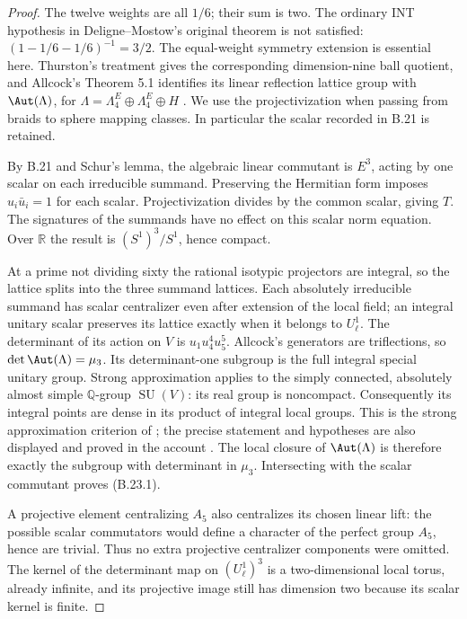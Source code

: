 \begin{proof}
The twelve weights are all \(1/6\); their sum is two.
The ordinary INT hypothesis in Deligne--Mostow's original
theorem is not satisfied: \((1-1/6-1/6)^{-1}=3/2\).
The equal-weight symmetry extension is essential here.
Thurston's treatment gives the corresponding dimension-nine
ball quotient, and Allcock's Theorem 5.1 identifies its linear
reflection lattice group with
\(\Aut(\Lambda)\), for
\(\Lambda=\Lambda_4^E\oplus\Lambda_4^E\oplus H\)
\citep{Thurston1998,Allcock2000}. We use the projectivization
when passing from braids to sphere mapping classes. In
particular the scalar recorded in B.21 is retained.

By B.21 and Schur's lemma, the algebraic linear commutant is
\(E^3\), acting by one scalar on each irreducible summand.
Preserving the Hermitian form imposes \(u_i\bar u_i=1\)
for each scalar. Projectivization divides by the common
scalar, giving \(T\). The signatures of the summands have
no effect on this scalar norm equation. Over \(\mathbb R\)
the result is \((S^1)^3/S^1\), hence compact.

At a prime not dividing sixty the rational isotypic
projectors are integral, so the lattice splits into the
three summand lattices. Each absolutely irreducible summand
has scalar centralizer even after extension of the local
field; an integral unitary scalar preserves its lattice
exactly when it belongs to \(U_\ell^1\). The determinant
of its action on \(V\) is \(u_1u_4^4u_5^5\).
Allcock's generators are triflections, so
\(\det\Aut(\Lambda)=\mu_3\). Its determinant-one
subgroup is the full integral special unitary group.
Strong approximation applies to the simply connected,
absolutely almost simple \(\mathbb Q\)-group
\(\operatorname{SU}(V)\): its real group is noncompact.
Consequently its integral points are dense in its product
of integral local groups. This is the strong approximation
criterion of \citet[Theorem 7.12]{PlatonovRapinchuk1994};
the precise statement and hypotheses are also displayed
and proved in the account
\citet[Theorem 2.3, Section 2.6]{Rapinchuk2012}.
The local closure of \(\Aut(\Lambda)\) is therefore exactly
the subgroup with determinant in \(\mu_3\). Intersecting
with the scalar commutant proves (B.23.1).

A projective element centralizing \(A_5\) also centralizes
its chosen linear lift: the possible scalar commutators
would define a character of the perfect group \(A_5\),
hence are trivial. Thus no extra projective centralizer
components were omitted. The kernel of the determinant
map on \((U_\ell^1)^3\) is a two-dimensional local torus,
already infinite, and its projective image still has
dimension two because its scalar kernel is finite.
\end{proof}

